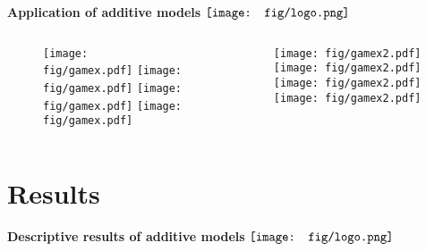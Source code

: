 \documentclass{beamer}
\begin{document}
\begin{frame}{\textbf{Application of additive models} \hspace{0pt plus 1 filll} $\vcenter{\hbox{\texttt{[image: fig/logo.png]}}}$}
\begin{columns}
\begin{column}{0.5\textwidth}
\begin{figure}
\begin{overprint}
\texttt{[image: fig/gamex.pdf]}
\texttt{[image: fig/gamex.pdf]}
\texttt{[image: fig/gamex.pdf]}
\texttt{[image: fig/gamex.pdf]}
\end{overprint}
\end{figure}
\end{column}
\begin{column}{0.5\textwidth}
\begin{figure}
\begin{overprint}
\texttt{[image: fig/gamex2.pdf]}
\texttt{[image: fig/gamex2.pdf]}
\texttt{[image: fig/gamex2.pdf]}
\texttt{[image: fig/gamex2.pdf]}
\end{overprint}
\end{figure}
\end{column}
\end{columns}
\end{frame}

\section{Results}

\begin{frame}{\textbf{Descriptive results of additive models} \hspace{0pt plus 1 filll} $\vcenter{\hbox{\texttt{[image: fig/logo.png]}}}$}
\vspace{-0.2in}
\begin{center}
\end{center}
\end{frame}
\end{document}
